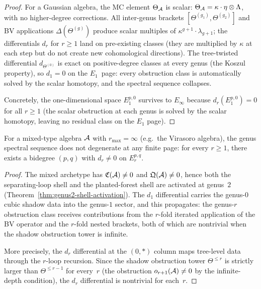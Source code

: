 \begin{proof}
For a Gaussian algebra, the MC element $\Theta_{\mathcal{A}}$ is
scalar: $\Theta_{\mathcal{A}} = \kappa \cdot \eta \otimes \Lambda$,
with no higher-degree corrections. All inter-genus
brackets $[\Theta^{(g_1)},\Theta^{(g_2)}]$ and BV applications
$\Delta(\Theta^{(g)})$ produce scalar multiples of
$\kappa^{g+1} \cdot \lambda_{g+1}$; the differentials $d_r$
for $r \geq 1$ land on pre-existing classes (they are
multiplied by $\kappa$ at each step but do not create new
cohomological directions). The tree-twisted differential
$d_{\Theta^{(0)}}$ is exact on positive-degree classes at
every genus (the Koszul property), so $d_1 = 0$ on the
$E_1$~page: every obstruction class is automatically solved
by the scalar homotopy, and the spectral sequence collapses.

Concretely, the one-dimensional space $E_1^{p,0}$ survives
to $E_\infty$ because $d_r(E_1^{p,0}) = 0$ for all $r \geq 1$
(the scalar obstruction at each genus is solved by the scalar
homotopy, leaving no residual class on the $E_1$ page).
\end{proof}

\begin{proposition}
\label{prop:thqg-VII-mixed-nondegeneration}
For a mixed-type algebra $\mathcal{A}$ with $r_{\max} = \infty$
\textup{(}e.g.\ the Virasoro algebra\textup{)}, the genus
spectral sequence does not degenerate at any finite page:
for every $r \geq 1$, there exists a bidegree $(p,q)$ with
$d_r \neq 0$ on $E_r^{p,q}$.
\end{proposition}

\begin{proof}
The mixed archetype has $\mathfrak{C}(\mathcal{A}) \neq 0$ and
$\mathfrak{Q}(\mathcal{A}) \neq 0$, hence both the separating-loop
shell and the planted-forest shell are activated at genus~$2$
(Theorem~\ref{thm:genus2-shell-activation}). The $d_1$
differential carries the genus-$0$ cubic shadow data into the
genus-$1$ sector, and this propagates: the genus-$r$
obstruction class receives contributions from the
$r$-fold iterated application of the BV operator and the
$r$-fold nested brackets, both of which are nontrivial when
the shadow obstruction tower is infinite.

More precisely, the $d_r$ differential at the $(0,*)$ column
maps tree-level data through the $r$-loop recursion. Since
the shadow obstruction tower $\Theta^{\leq r}$ is strictly larger than
$\Theta^{\leq r-1}$ for every~$r$ (the obstruction
$o_{r+1}(\mathcal{A}) \neq 0$ by the infinite-depth condition),
the $d_r$ differential is nontrivial for each~$r$.
\end{proof}

